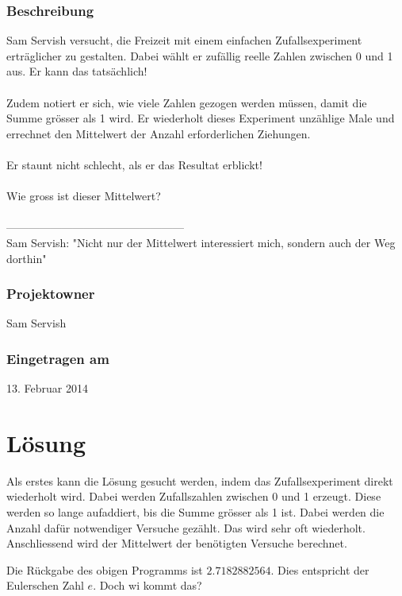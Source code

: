 \documentclass[a4paper, 10pt, fleqn]{article}
\begin{document}
\subsubsection*{Beschreibung}
Sam Servish versucht, die Freizeit mit einem einfachen Zufallsexperiment 
erträglicher zu gestalten. Dabei wählt er zufällig reelle Zahlen zwischen 0 
und 1 aus. Er kann das tatsächlich!
\\\\
Zudem notiert er sich, wie viele Zahlen gezogen werden müssen, damit die Summe 
grösser als 1 wird. Er wiederholt dieses Experiment unzählige Male und 
errechnet den Mittelwert der Anzahl erforderlichen Ziehungen.
\\\\
Er staunt nicht schlecht, als er das Resultat erblickt!
\\\\
Wie gross ist dieser Mittelwert?
\\\\
------------------------------------------------\\
Sam Servish: "Nicht nur der Mittelwert interessiert mich, sondern auch der Weg 
dorthin"

\subsubsection*{Projektowner}
Sam Servish 

\subsubsection*{Eingetragen am}
13. Februar 2014 \\

\newpage

\section{Lösung}
Als erstes kann die Lösung gesucht werden, indem das Zufallsexperiment direkt 
wiederholt wird. Dabei werden Zufallszahlen zwischen 0 und 1 erzeugt. Diese 
werden so lange aufaddiert, bis die Summe grösser als 1 ist. Dabei werden die 
Anzahl dafür notwendiger Versuche gezählt. Das wird sehr oft wiederholt. 
Anschliessend wird der Mittelwert der benötigten Versuche berechnet. 

Die Rückgabe des obigen Programms ist $2.7182882564$. Dies entspricht der 
Eulerschen Zahl $e$. Doch wi kommt das? 
\\

\clearpage


%   

\end{document}
